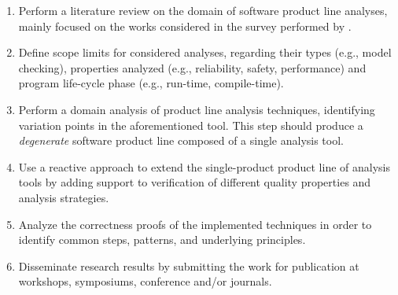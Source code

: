 \begin{enumerate}
    \item
        Perform a literature review on the domain of software product line
        analyses, mainly focused on the works considered in the survey
        performed by \cite{Thum2014}.

    \item
        Define scope limits for considered analyses, regarding their types
        (e.g., model checking), properties analyzed (e.g., reliability, safety, performance) and
        program life-cycle phase (e.g., run-time, compile-time).

    \item
        Perform a domain analysis of product line analysis techniques, identifying
        variation points in the aforementioned tool. This step should produce
        a \emph{degenerate} software product line composed of a single
        analysis tool.

    \item
        Use a reactive approach to extend the single-product product line of analysis
        tools by adding support to verification of different quality
        properties and analysis strategies.

    \item
        Analyze the correctness proofs of the implemented techniques
        in order to identify common steps, patterns, and underlying principles.

%
%        
    
    \item Disseminate research results by submitting the work for publication at workshops, symposiums, conference and/or journals.
\end{enumerate}



